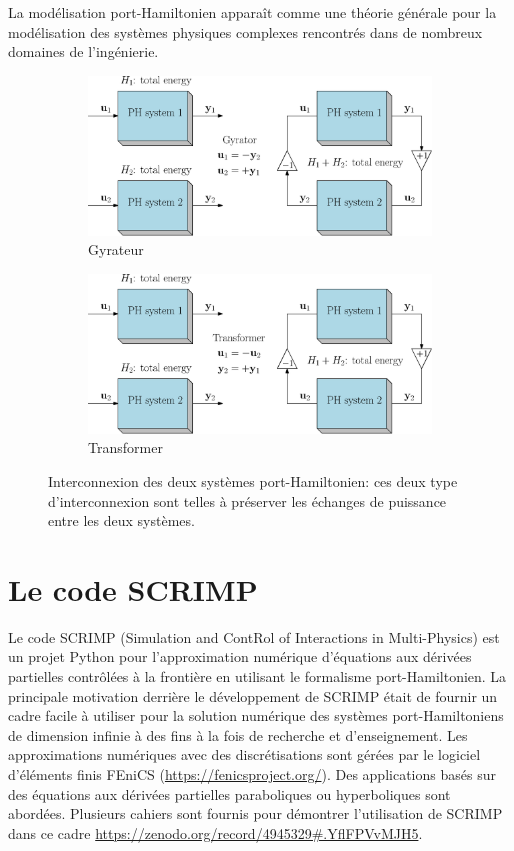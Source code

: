 \documentclass[12pt, french]{article}
\begin{document}
La modélisation port-Hamiltonien apparaît comme une théorie générale pour la modélisation des systèmes physiques complexes rencontrés dans de nombreux domaines de l'ingénierie.


	\begin{figure}[b]
	\begin{subfigure}[t]{0.45\textwidth}
		\includegraphics[width=\columnwidth]{sketch_PH_gyrator.eps} 
		\caption{Gyrateur}
		\label{fig:pHsys_gyr}
	\end{subfigure}\hfill
	\begin{subfigure}[t]{0.45\textwidth}
		\includegraphics[width=\columnwidth]{sketch_PH_transformer.eps}%
		\caption{Transformer}
		\label{fig:pHsys_tran}
	\end{subfigure}
	\caption[]{Interconnexion des deux systèmes port-Hamiltonien: ces deux type d'interconnexion sont telles \`a préserver les échanges de puissance entre les deux systèmes.}%
	\label{fig:intPH}%
\end{figure}


\section{Le code SCRIMP}\label{sec:SCRIMP}
Le code SCRIMP (Simulation and ContRol of Interactions in Multi-Physics) est un projet Python pour l'approximation numérique d'équations aux dérivées partielles contrôlées \`a la frontière en utilisant le formalisme port-Hamiltonien. La principale motivation derrière le développement de SCRIMP était de fournir un cadre facile à utiliser pour la solution numérique des systèmes port-Hamiltoniens de dimension infinie à des fins à la fois de recherche et d'enseignement. Les approximations numériques avec des discrétisations sont gérées par le logiciel d'éléments finis FEniCS (\url{https://fenicsproject.org/}). Des applications basés sur des équations aux dérivées partielles paraboliques ou hyperboliques sont abordées. Plusieurs cahiers sont fournis pour démontrer l'utilisation de SCRIMP dans ce cadre \url{https://zenodo.org/record/4945329\#.YflFPVvMJH5}.
	


	
	
\end{document}
